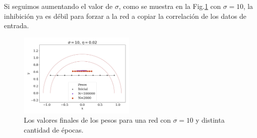 Si seguimos aumentando el valor de $\sigma$, como se muestra en la Fig.\ref{fig:sigma10} con $\sigma=10$, la inhibición ya es débil para forzar a la red a copiar la correlación de los datos de entrada.

\begin{figure}[H]
	\centering
	\includegraphics[width=0.5\textwidth]{../Graficos/sigma10eta0_02.png}
	\caption{Los valores finales de los pesos para una red con $\sigma=10$ y distinta cantidad de épocas.}
	\label{fig:sigma10}
\end{figure}


